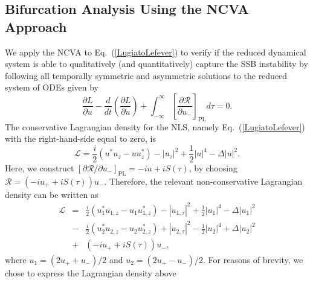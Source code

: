 \subsection{Bifurcation Analysis Using the NCVA Approach
\label{secNCVA:app}}
%
We apply the NCVA to Eq.~(\ref{LugiatoLefever}) to verify if the reduced
dynamical system is able to qualitatively (and quantitatively) capture the 
SSB instability by following all temporally symmetric and asymmetric solutions 
to the reduced system of ODEs given by %
\begin{equation}
\frac{\partial L}{\partial u} - \frac{d}{dt}\left( \frac{\partial L}{\partial \dot{u}} \right) + \int_{-\infty}^\infty \left[ \frac{\partial \mathcal{R}}{\partial u_- }\right]_{\mathrm{PL}} d\tau = 0. 
\label{NCVAODE}
\end{equation}
%
The conservative Lagrangian density for the NLS, namely Eq.~(\ref{LugiatoLefever})
with the right-hand-side equal to zero, is
%
\begin{equation}
\mathcal{L} = \frac{i}{2} \left(u^* u_z- u u_z^*\right) -  \left\vert u_{\tau}\right\vert^2 +  \frac{1}{2}\left\vert u \right\vert^4 - \Delta \left\vert u \right\vert^2.
\end{equation}
%
Here, we construct $\left[ \partial \mathcal{R}/\partial u_- \right]_{\mathrm{PL}} = - iu + i S(\tau)$, by choosing $\mathcal{R} = \left( -iu_{+} + i S(\tau) \right)u_-$.  Therefore, the relevant non-conservative Lagrangian density can be written as
%
\begin{eqnarray}
\mathcal{L} &=& \frac{i}{2} \left(u_{1}^* u_{1,z}- u_{1} u_{1,z}^*\right) -  \left\vert u_{1,\tau}\right\vert^2 + \frac{1}{2} \left\vert u_1 \right\vert^4 -  \Delta  \left\vert u_1 \right\vert^2  \nonumber
 \\
&-& \frac{i}{2} \left(u_{2}^* u_{2,z}- u_{2} u_{2,z}^*\right) +  \left\vert u_{2,\tau}\right\vert^2 -\frac{1}{2}  \left\vert u_2 \right\vert^4 +  \Delta  \left\vert u_2 \right\vert^2  \nonumber \\ 
&+& \left( - iu_{+} + i S(\tau) \right)u_-,  
\end{eqnarray}
%
where $u_1 = \left( 2u_+ + u_- \right)/2$ and $u_2 = \left(2u_+ - u_- \right)/2$.
%
For reasons of brevity, we chose to express the Lagrangian density above
